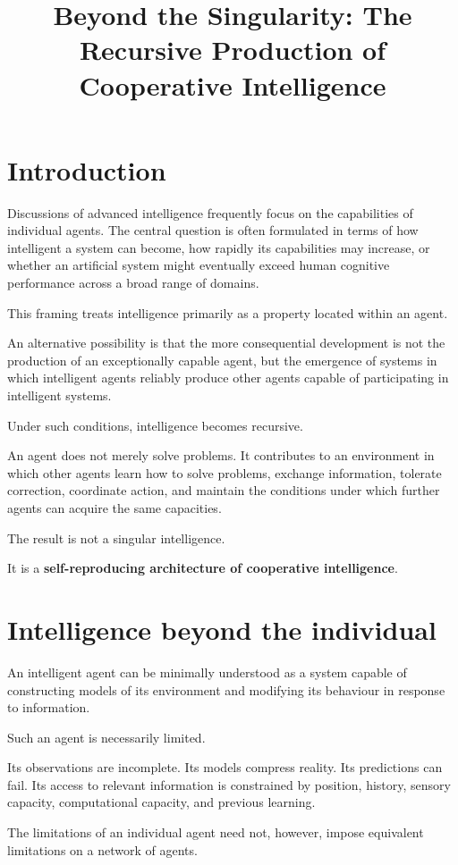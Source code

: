 \documentclass[11pt, a4paper]{article}
\title{Beyond the Singularity: The Recursive Production of Cooperative Intelligence}
\author{}
\date{}
\begin{document}
\maketitle

\section*{Introduction}
Discussions of advanced intelligence frequently focus on the capabilities of individual agents. The central question is often formulated in terms of how intelligent a system can become, how rapidly its capabilities may increase, or whether an artificial system might eventually exceed human cognitive performance across a broad range of domains.

This framing treats intelligence primarily as a property located within an agent.

An alternative possibility is that the more consequential development is not the production of an exceptionally capable agent, but the emergence of systems in which intelligent agents reliably produce other agents capable of participating in intelligent systems.

Under such conditions, intelligence becomes recursive.

An agent does not merely solve problems. It contributes to an environment in which other agents learn how to solve problems, exchange information, tolerate correction, coordinate action, and maintain the conditions under which further agents can acquire the same capacities.

The result is not a singular intelligence.

It is a \textbf{self-reproducing architecture of cooperative intelligence}.

\section{Intelligence beyond the individual}
An intelligent agent can be minimally understood as a system capable of constructing models of its environment and modifying its behaviour in response to information.

Such an agent is necessarily limited.

Its observations are incomplete. Its models compress reality. Its predictions can fail. Its access to relevant information is constrained by position, history, sensory capacity, computational capacity, and previous learning.

The limitations of an individual agent need not, however, impose equivalent limitations on a network of agents.
\end{document}
